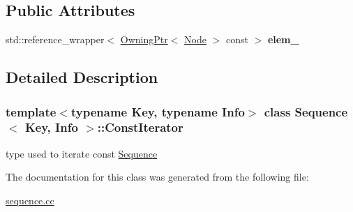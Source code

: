 \subsection*{Public Attributes}
\begin{DoxyCompactItemize}
\item 
\mbox{\label{structSequence_1_1ConstIterator_aa684ddaf3fdb10f765c8937c6011a26f}} 
std\+::reference\+\_\+wrapper$<$ \mbox{\hyperlink{structOwningPtr}{Owning\+Ptr}}$<$ \mbox{\hyperlink{structSequence_1_1Node}{Node}} $>$ const  $>$ {\bfseries elem\+\_\+}
\end{DoxyCompactItemize}


\subsection{Detailed Description}
\subsubsection*{template$<$typename Key, typename Info$>$\newline
class Sequence$<$ Key, Info $>$\+::\+Const\+Iterator}

type used to iterate const \mbox{\hyperlink{structSequence}{Sequence}} 

The documentation for this class was generated from the following file\+:\begin{DoxyCompactItemize}
\item 
\mbox{\hyperlink{sequence_8cc}{sequence.\+cc}}\end{DoxyCompactItemize}
